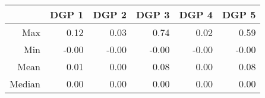 \begin{table}[ht]
\centering
\begin{tabular}{rrrrrr}
  \hline
 & DGP 1 & DGP 2 & DGP 3 & DGP 4 & DGP 5 \\ 
  \hline
Max & 0.12 & 0.03 & 0.74 & 0.02 & 0.59 \\ 
  Min & -0.00 & -0.00 & -0.00 & -0.00 & -0.00 \\ 
  Mean & 0.01 & 0.00 & 0.08 & 0.00 & 0.08 \\ 
  Median & 0.00 & 0.00 & 0.00 & 0.00 & 0.00 \\ 
   \hline
\end{tabular}
\end{table}

